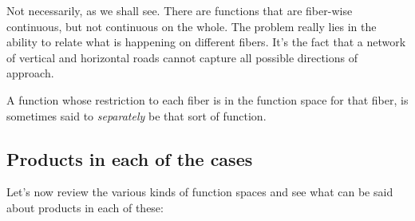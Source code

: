 \documentclass[a4paper]{amsart}
\begin{document}
Not necessarily, as we shall see. There are functions that are
fiber-wise continuous, but not continuous on the whole. The problem
really lies in the ability to relate what is happening on different
fibers. It's the fact that a network of vertical and horizontal roads
cannot capture all possible directions of approach.

A function whose restriction to each fiber is in the function space
for that fiber, is sometimes said to {\em separately} be that sort of
function.

\subsection{Products in each of the cases}

Let's now review the various kinds of function spaces and see what can
be said about products in each of these:
\end{document}
